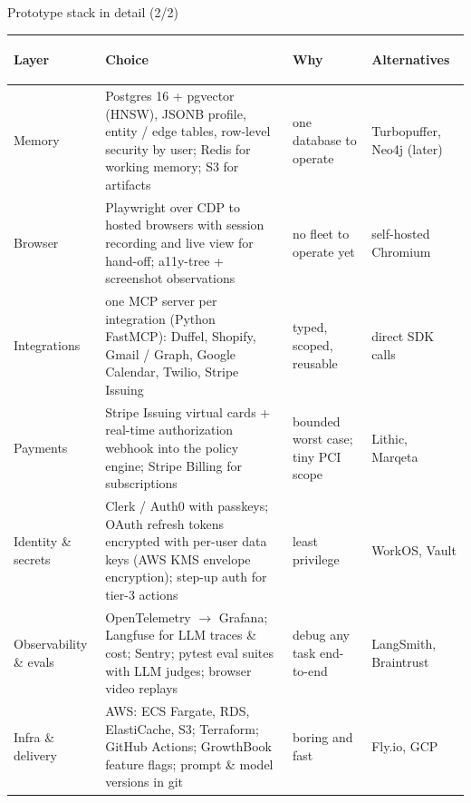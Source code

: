 \documentclass[aspectratio=169,10pt]{beamer}
\begin{document}
\begin{frame}{Prototype stack in detail (2/2)}
\scriptsize
\renewcommand{\arraystretch}{1.08}
\begin{tabularx}{\linewidth}{>{\bfseries\raggedright\arraybackslash}p{2.0cm} X p{2.9cm} p{2.2cm}}
\toprule
Layer & Choice & Why & Alternatives\\
\midrule
Memory & Postgres 16 + pgvector (HNSW), JSONB profile, entity / edge tables, row-level security by user; Redis for working memory; S3 for artifacts & one database to operate & Turbopuffer, Neo4j (later)\\
Browser & Playwright over CDP to hosted browsers with session recording and live view for hand-off; a11y-tree + screenshot observations & no fleet to operate yet & self-hosted Chromium\\
Integrations & one MCP server per integration (Python FastMCP): Duffel, Shopify, Gmail / Graph, Google Calendar, Twilio, Stripe Issuing & typed, scoped, reusable & direct SDK calls\\
Payments & Stripe Issuing virtual cards + real-time authorization webhook into the policy engine; Stripe Billing for subscriptions & bounded worst case; tiny PCI scope & Lithic, Marqeta\\
Identity \& secrets & Clerk / Auth0 with passkeys; OAuth refresh tokens encrypted with per-user data keys (AWS KMS envelope encryption); step-up auth for tier-3 actions & least privilege & WorkOS, Vault\\
Observability \& evals & OpenTelemetry $\rightarrow$ Grafana; Langfuse for LLM traces \& cost; Sentry; pytest eval suites with LLM judges; browser video replays & debug any task end-to-end & LangSmith, Braintrust\\
Infra \& delivery & AWS: ECS Fargate, RDS, ElastiCache, S3; Terraform; GitHub Actions; GrowthBook feature flags; prompt \& model versions in git & boring and fast & Fly.io, GCP\\
\bottomrule
\end{tabularx}
\end{frame}
\end{document}
